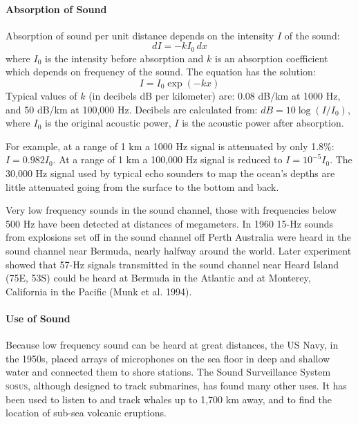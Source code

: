 \paragraph{Absorption of Sound}
Absorption of sound per unit distance
depends on the intensity $I$ of the sound:
\begin{equation}
dI = -k I_0 \, dx
\end{equation}
where $I_0$ is the intensity before absorption and $k$ is an absorption
coefficient which depends on frequency of the sound. The equation has the
solution:
\begin{equation}
I = I_0 \exp(-kx)
\end{equation}
Typical values of $k$ (in decibels dB per kilometer) are: 0.08 dB/km at 1000 Hz,
and 50 dB/km at 100,000 Hz. Decibels are calculated from: $dB = 10 \log(I/I_0)$,
where $I_0$ is the original acoustic power, $I$ is the acoustic power after
absorption.

For example, at a range of 1 km a 1000 Hz signal is attenuated by only 1.8\%: $I =
0.982 I_0$. At a range of 1 km a 100,000 Hz signal is reduced to $I = 10^{-5}
I_0$. The 30,000 Hz signal used by typical echo sounders to
map the ocean's depths are little attenuated going from the surface to the bottom
and back.

Very low frequency sounds in the sound channel, those with
frequencies below 500 Hz have been detected at distances of megameters. In 1960 15-Hz sounds
from explosions set off in the sound channel off Perth
Australia were heard in the sound channel near Bermuda, nearly halfway around the world. Later
experiment showed that 57-Hz signals transmitted in the sound channel near Heard
Island (75\degrees E, 53\degrees S) could be heard at Bermuda in the Atlantic and
at Monterey, California in the Pacific (Munk et al. 1994).

\paragraph{Use of Sound}
Because low frequency sound can be heard at
great distances, the US Navy, in the 1950s, placed arrays of
microphones on the sea floor in deep and shallow water and
connected them to shore stations. The Sound Surveillance System
\textsc{sosus}, although designed to track submarines, has found
many other uses. It has been used to listen to and track whales up
to 1,700 km away, and to find the location of sub-sea volcanic
eruptions.

